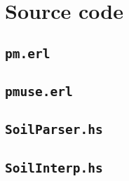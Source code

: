 
\section{Source code}

\subsection{\texttt{pm.erl}}


\subsection{\texttt{pmuse.erl}}


\subsection{\texttt{SoilParser.hs}}


\subsection{\texttt{SoilInterp.hs}}

